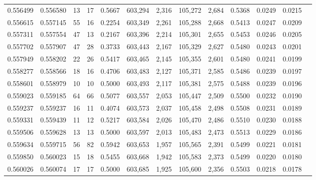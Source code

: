 \begin{tabular}{rrrrrrrrrrrrr}
0.556499 & 0.556580 &    13 &    17 &                                     0.5667 & 603,294 &   2,316 & 105,272 &   2,684 & 0.5368 & 0.0249 & 0.0215 \\
0.556615 & 0.557145 &    55 &    16 &                                     0.2254 & 603,349 &   2,261 & 105,288 &   2,668 & 0.5413 & 0.0247 & 0.0209 \\
0.557311 & 0.557554 &    47 &    13 &                                     0.2167 & 603,396 &   2,214 & 105,301 &   2,655 & 0.5453 & 0.0246 & 0.0205 \\
0.557702 & 0.557907 &    47 &    28 &                                     0.3733 & 603,443 &   2,167 & 105,329 &   2,627 & 0.5480 & 0.0243 & 0.0201 \\
0.557949 & 0.558202 &    22 &    26 &                                     0.5417 & 603,465 &   2,145 & 105,355 &   2,601 & 0.5480 & 0.0241 & 0.0199 \\
0.558277 & 0.558566 &    18 &    16 &                                     0.4706 & 603,483 &   2,127 & 105,371 &   2,585 & 0.5486 & 0.0239 & 0.0197 \\
0.558601 & 0.558979 &    10 &    10 &                                     0.5000 & 603,493 &   2,117 & 105,381 &   2,575 & 0.5488 & 0.0239 & 0.0196 \\
0.559023 & 0.559185 &    64 &    66 &                                     0.5077 & 603,557 &   2,053 & 105,447 &   2,509 & 0.5500 & 0.0232 & 0.0190 \\
0.559237 & 0.559237 &    16 &    11 &                                     0.4074 & 603,573 &   2,037 & 105,458 &   2,498 & 0.5508 & 0.0231 & 0.0189 \\
0.559331 & 0.559439 &    11 &    12 &                                     0.5217 & 603,584 &   2,026 & 105,470 &   2,486 & 0.5510 & 0.0230 & 0.0188 \\
0.559506 & 0.559628 &    13 &    13 &                                     0.5000 & 603,597 &   2,013 & 105,483 &   2,473 & 0.5513 & 0.0229 & 0.0186 \\
0.559634 & 0.559715 &    56 &    82 &                                     0.5942 & 603,653 &   1,957 & 105,565 &   2,391 & 0.5499 & 0.0221 & 0.0181 \\
0.559850 & 0.560023 &    15 &    18 &                                     0.5455 & 603,668 &   1,942 & 105,583 &   2,373 & 0.5499 & 0.0220 & 0.0180 \\
0.560026 & 0.560074 &    17 &    17 &                                     0.5000 & 603,685 &   1,925 & 105,600 &   2,356 & 0.5503 & 0.0218 & 0.0178 \\

\end{tabular}
